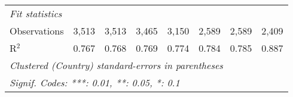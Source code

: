 \begin{tabular}{lccccccc}
   \midrule \emph{Fit statistics}\\
   Observations                                                    & 3,513         & 3,513         & 3,465        & 3,150        & 2,589         & 2,589         & 2,409\\  
   R$^2$                                                           & 0.767         & 0.768         & 0.769        & 0.774        & 0.784         & 0.785         & 0.887\\  
   \midrule
   \multicolumn{8}{l}{\emph{Clustered (Country) standard-errors in parentheses}}\\
   \multicolumn{8}{l}{\emph{Signif. Codes: ***: 0.01, **: 0.05, *: 0.1}}\\
\end{tabular}
\par\endgroup


